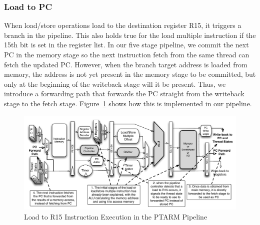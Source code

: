 \subsubsection{Load to PC}    
When load/store operations load to the destination register R15, it triggers a branch in the pipeline.
This also holds true for the load multiple instruction if the 15th bit is set in the register list.
In our five stage pipeline, we commit the next PC in the memory stage so the next instruction fetch from the same thread can fetch the updated PC.
However, when the branch target address is loaded from memory, the address is not yet present in the memory stage to be committed, but only at the beginning of the writeback stage will it be present. 
Thus, we introduce a forwarding path that forwards the PC straight from the writeback stage to the fetch stage. 
Figure~\ref{fig:ld_to_pc_pipeline_implementation} shows how this is implemented in our pipeline.   
\begin{figure}
  \vspace{-20pt}
  \begin{center}
    \includegraphics[scale=.54]{figs/ld_to_pc_pipeline_implementation}
  \end{center}
  \vspace{-20pt}
  \caption{Load to R15 Instruction Execution in the PTARM Pipeline}
  \label{fig:ld_to_pc_pipeline_implementation}
\end{figure}

